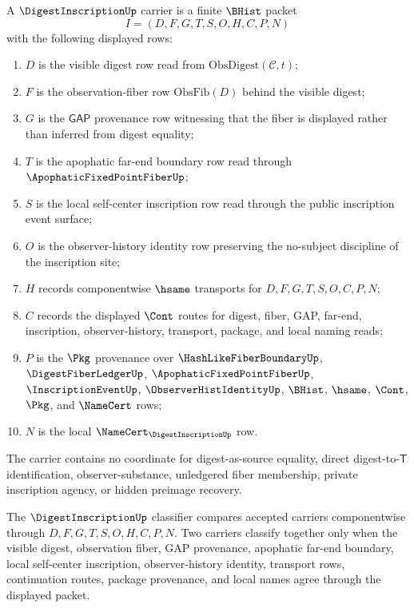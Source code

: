 \begin{definition}
\label{def:digest-inscription-carrier}
A $\DigestInscriptionUp$ carrier is a finite $\BHist$ packet
$$
I=(D,F,G,T,S,O,H,C,P,N)
$$
with the following displayed rows:
\begin{enumerate}
\item $D$ is the visible digest row read from $\mathrm{ObsDigest}(\mathcal{C},t)$;
\item $F$ is the observation-fiber row $\mathrm{ObsFib}(D)$ behind the visible digest;
\item $G$ is the $\mathsf{GAP}$ provenance row witnessing that the fiber is displayed rather than inferred from digest equality;
\item $T$ is the apophatic far-end boundary row read through $\ApophaticFixedPointFiberUp$;
\item $S$ is the local self-center inscription row read through the public inscription event surface;
\item $O$ is the observer-history identity row preserving the no-subject discipline of the inscription site;
\item $H$ records componentwise $\hsame$ transports for $D,F,G,T,S,O,C,P,N$;
\item $C$ records the displayed $\Cont$ routes for digest, fiber, GAP, far-end, inscription, observer-history, transport, package, and local naming reads;
\item $P$ is the $\Pkg$ provenance over $\HashLikeFiberBoundaryUp$, $\DigestFiberLedgerUp$, $\ApophaticFixedPointFiberUp$, $\InscriptionEventUp$, $\ObserverHistIdentityUp$, $\BHist$, $\hsame$, $\Cont$, $\Pkg$, and $\NameCert$ rows;
\item $N$ is the local $\NameCert_{\DigestInscriptionUp}$ row.
\end{enumerate}
The carrier contains no coordinate for digest-as-source equality, direct digest-to-$\mathsf{T}$ identification, observer-substance, unledgered fiber membership, private inscription agency, or hidden preimage recovery.
\end{definition}

\begin{definition}
\label{def:digest-inscription-classifier}
The $\DigestInscriptionUp$ classifier compares accepted carriers componentwise through $D,F,G,T,S,O,H,C,P,N$. Two carriers classify together only when the visible digest, observation fiber, GAP provenance, apophatic far-end boundary, local self-center inscription, observer-history identity, transport rows, continuation routes, package provenance, and local names agree through the displayed packet.
\end{definition}


